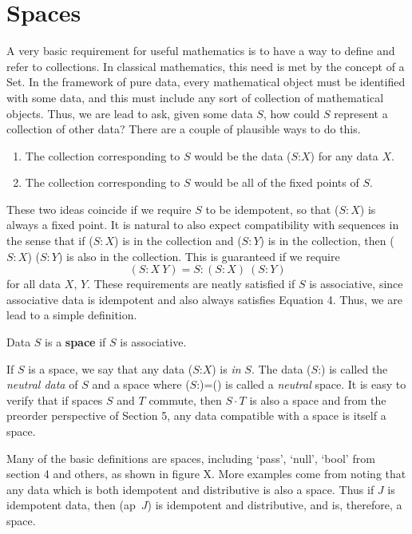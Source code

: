 \documentclass[11pt]{article}
\begin{document}
\section{Spaces}

      A very basic requirement for useful mathematics is to have a way to define and refer to collections.  In classical mathematics, this 
need is met by the concept of a Set.  In the framework of pure data, every mathematical object must be identified with some data, and this must include any sort of collection of mathematical objects.  
Thus, we are lead to ask, given some data $S$, how could $S$ represent a collection of other data?  
There are a couple of plausible ways to do this.  
\begin{enumerate} 
\item The collection corresponding to $S$ would be the data ($S$:$X$) for any data $X$.
\item The collection corresponding to $S$ would be all of the fixed points of $S$.  
\end{enumerate}
These two ideas coincide if we require $S$ to be idempotent, so that ($S:X$) is always a fixed point.  It is natural to also expect compatibility with 
sequences in the sense that if ($S:X$) is in the collection and ($S:Y$) is in the collection, then ($S:X$) ($S:Y$) is also in the collection.  
This is guaranteed if we require 
\begin{equation}
(S : X\ Y) = S : (S:X)\ (S:Y)
\end{equation}
for all data $X$, $Y$.  
These requirements are neatly satisfied if $S$ is associative, since associative data is idempotent and also always satisfies 
Equation 4.  Thus, we are lead to a simple definition.  
\begin{definition} Data $S$ is a {\bf space} if $S$ is associative.
\end{definition}
\noindent If $S$ is a space, we say that any data ($S$:$X$) is {\it in} $S$.  
The data ($S$:) is called the {\it neutral data} of $S$ and a space where ($S$:)=() is called a {\it neutral} space.  
It is easy to verify that if spaces $S$ and $T$ commute, then $S\cdot T$ is 
also a space and from the preorder perspective of Section 5, any data compatible with a space is itself a space. 

Many of the basic definitions are spaces, including `pass', `null', `bool' from section 4 and others, as shown in figure X.  
More examples come from noting that any data which is both idempotent and distributive is also a space.  Thus if $J$ is idempotent data, then 
(ap\ $J$) is idempotent and distributive, and is, therefore, a space.    
\end{document}

